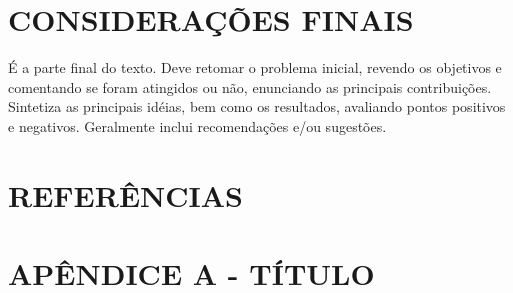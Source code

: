 \documentclass[
	12pt,				%
	oneside,			%
	a4paper,			%
	english,			%
	french,				%
	spanish,			%
	brazil,				%
	]{abntex2}
\theoremstyle{plain}
\theoremstyle{definition}
\begin{document}
%	
%
%
%
%
%

\chapter*[Conclusão]{CONSIDERAÇÕES FINAIS}

É a parte final do texto. Deve retomar o problema inicial, revendo os objetivos
e comentando se foram atingidos ou não, enunciando as principais contribuições.
Sintetiza as principais idéias, bem como os resultados, avaliando pontos positivos e
negativos. Geralmente inclui recomendações e/ou sugestões. 

	\chapter*[Referências]{REFERÊNCIAS}












\chapter*[Apêndice]{APÊNDICE A - TÍTULO}
\end{document}
